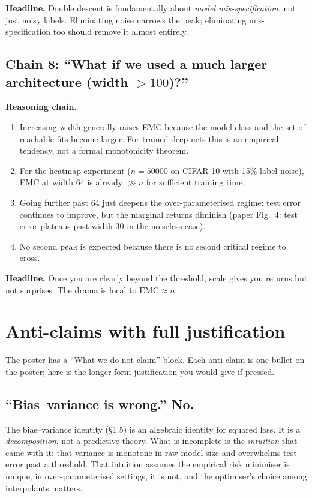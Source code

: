 \documentclass[11pt,a4paper]{article}
\theoremstyle{definition}
\begin{document}
\textbf{Headline.} Double descent is fundamentally about \emph{model mis-specification}, not just noisy labels. Eliminating noise narrows the peak; eliminating mis-specification too should remove it almost entirely.

\subsection{Chain 8: ``What if we used a much larger architecture (width $> 100$)?''}

\textbf{Reasoning chain.}
\begin{enumerate}[leftmargin=1.4em]
\item Increasing width generally raises EMC because the model class and the set of reachable fits become larger. For trained deep nets this is an empirical tendency, not a formal monotonicity theorem.
\item For the heatmap experiment ($n = 50000$ on CIFAR-10 with 15\% label noise), EMC at width 64 is already $\gg n$ for sufficient training time.
\item Going further past 64 just deepens the over-parameterised regime: test error continues to improve, but the marginal returns diminish (paper Fig.\ 4: test error plateaus past width 30 in the noiseless case).
\item No second peak is expected because there is no second critical regime to cross.
\end{enumerate}

\textbf{Headline.} Once you are clearly beyond the threshold, scale gives you returns but not surprises. The drama is local to $\mathrm{EMC}\approx n$.

\section{Anti-claims with full justification}

The poster has a ``What we do not claim'' block. Each anti-claim is one bullet on the poster; here is the longer-form justification you would give if pressed.

\subsection{``Bias--variance is wrong.'' \textbf{No.}}

The bias--variance identity (\S1.5) is an algebraic identity for squared loss. It is a \emph{decomposition}, not a predictive theory. What is incomplete is the \emph{intuition} that came with it: that variance is monotone in raw model size and overwhelms test error past a threshold. That intuition assumes the empirical risk minimiser is unique; in over-parameterised settings, it is not, and the optimiser's choice among interpolants matters.
\end{document}
